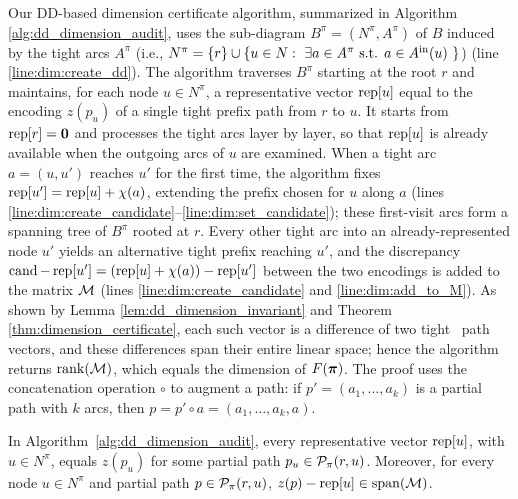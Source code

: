 Our DD-based dimension certificate algorithm, summarized in Algorithm \ref{alg:dd_dimension_audit}, uses the sub-diagram $B^\pi= (N^\pi, A^\pi)$ of $B$ induced by the tight arcs $A^\pi$ (i.e., $N^\pi =\{r\}\cup \{ u \in N: \ \exists a \in A^\pi \text{ s.t. $a\in A^{\rm in}(u)$ } \}$) (line \ref{line:dim:create_dd}). The algorithm traverses $B^\pi$ starting at the root $r$ and maintains, for each node $u\in N^\pi$, a representative vector $\operatorname{rep}[u]$ equal to the encoding $z(p_u)$ of a single tight prefix path from $r$ to $u$. It starts from $\operatorname{rep}[r]=\mathbf{0}$ and processes the tight arcs layer by layer, so that $\operatorname{rep}[u]$ is already available when the outgoing arcs of $u$ are examined. When a tight arc $a=(u,u')$ reaches $u'$ for the first time, the algorithm fixes $\operatorname{rep}[u']=\operatorname{rep}[u]+\chi(a)$, extending the prefix chosen for $u$ along $a$ (lines \ref{line:dim:create_candidate}--\ref{line:dim:set_candidate}); these first-visit arcs form a spanning tree of $B^\pi$ rooted at $r$. Every other tight arc into an already-represented node $u'$ yields an alternative tight prefix reaching $u'$, and the discrepancy $\operatorname{cand}-\operatorname{rep}[u']=(\operatorname{rep}[u]+\chi(a))-\operatorname{rep}[u']$ between the two encodings is added to the matrix $\mathcal{M}$ (lines \ref{line:dim:create_candidate} and \ref{line:dim:add_to_M}). As shown by Lemma \ref{lem:dd_dimension_invariant} and Theorem \ref{thm:dimension_certificate}, each such vector is a difference of two tight \rt\ path vectors, and these differences span their entire linear space; hence the algorithm returns $\operatorname{rank}(\mathcal{M})$, which equals the dimension of $F(\bm{\pi})$. The proof uses the concatenation operation $\circ$ to augment a path: if $p' = (a_1,\ldots, a_k)$ is a partial path with $k$ arcs, then  $p = p' \circ a = (a_1,\ldots, a_k, a)$.


\begin{lemma}
\label{lem:dd_dimension_invariant}
In Algorithm~\ref{alg:dd_dimension_audit}, every representative vector $\operatorname{rep}[u]$, with $u \in N^\pi$, equals $z(p_u)$ for some partial path $p_u\in\mathcal{P}_\pi(r,u)$. Moreover, for every node $u \in N^\pi$ and partial path $p\in\mathcal{P}_\pi(r,u)$, $z(p)-\operatorname{rep}[u]\in\operatorname{span}(\mathcal{M})$.
\end{lemma}

